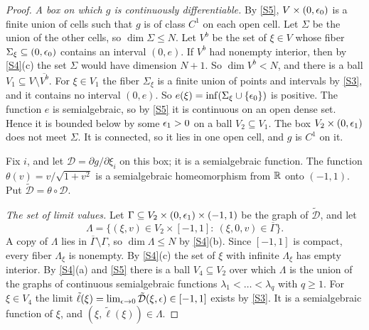 \begin{proof}
\emph{A box on which $g$ is continuously differentiable.} By \ref{S5}, $V\times(0,\epsilon_0)$ is a finite union of cells such that $g$ is of class $C^1$ on each open cell. Let $\Sigma$ be the union of the other cells, so $\dim\Sigma\le N$. Let $V^b$ be the set of $\xi\in V$ whose fiber $\Sigma_\xi\subseteq(0,\epsilon_0)$ contains an interval $(0,e)$. If $V^b$ had nonempty interior, then by \ref{S4}(c) the set $\Sigma$ would have dimension $N+1$. So $\dim V^b<N$, and there is a ball $V_1\subseteq V\setminus\overline{V^b}$. For $\xi\in V_1$ the fiber $\Sigma_\xi$ is a finite union of points and intervals by \ref{S3}, and it contains no interval $(0,e)$. So $e(\xi)=\inf(\Sigma_\xi\cup\{\epsilon_0\})$ is positive. The function $e$ is semialgebraic, so by \ref{S5} it is continuous on an open dense set. Hence it is bounded below by some $\epsilon_1>0$ on a ball $V_2\subseteq V_1$. The box $V_2\times(0,\epsilon_1)$ does not meet $\Sigma$. It is connected, so it lies in one open cell, and $g$ is $C^1$ on it.

Fix $i$, and let $\mathcal D=\partial g/\partial\xi_i$ on this box; it is a semialgebraic function. The function $\theta(v)=v/\sqrt{1+v^2}$ is a semialgebraic homeomorphism from $\mathbb{R}$ onto $(-1,1)$. Put $\tilde{\mathcal D}=\theta\circ\mathcal D$.

\emph{The set of limit values.} Let $\Gamma\subseteq V_2\times(0,\epsilon_1)\times(-1,1)$ be the graph of $\tilde{\mathcal D}$, and let
\[
\Lambda=\{(\xi,v)\in V_2\times[-1,1]:\ (\xi,0,v)\in\overline\Gamma\}.
\]
A copy of $\Lambda$ lies in $\overline\Gamma\setminus\Gamma$, so $\dim\Lambda\le N$ by \ref{S4}(b). Since $[-1,1]$ is compact, every fiber $\Lambda_\xi$ is nonempty. By \ref{S4}(c) the set of $\xi$ with infinite $\Lambda_\xi$ has empty interior. By \ref{S4}(a) and \ref{S5} there is a ball $V_4\subseteq V_2$ over which $\Lambda$ is the union of the graphs of continuous semialgebraic functions $\lambda_1<\dots<\lambda_q$ with $q\ge1$. For $\xi\in V_4$ the limit $\tilde\ell(\xi)=\lim_{\epsilon\to0}\tilde{\mathcal D}(\xi,\epsilon)\in[-1,1]$ exists by \ref{S3}. It is a semialgebraic function of $\xi$, and $(\xi,\tilde\ell(\xi))\in\Lambda$.


\end{proof}
